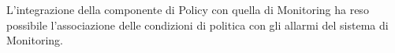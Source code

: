 L'integrazione della componente di Policy con quella di Monitoring ha reso possibile l'associazione delle condizioni di politica con gli allarmi del sistema di Monitoring.



